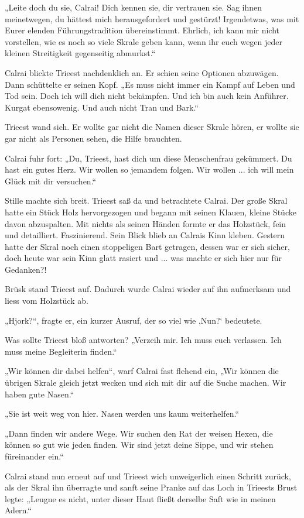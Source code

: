 „Leite doch du sie, Calrai! Dich kennen sie, dir vertrauen sie. Sag ihnen meinetwegen, du hättest mich herausgefordert und gestürzt! Irgendetwas, was mit Eurer elenden Führungstradition übereinstimmt. Ehrlich, ich kann mir nicht vorstellen, wie es noch so viele Skrale geben kann, wenn ihr euch wegen jeder kleinen Streitigkeit gegenseitig abmurkst.“

Calrai blickte Trieest nachdenklich an. Er schien seine Optionen abzuwägen. Dann schüttelte er seinen Kopf. „Es muss nicht immer ein Kampf auf Leben und Tod sein. Doch ich will dich nicht bekämpfen. Und ich bin auch kein Anführer. Kurgat ebensowenig. Und auch nicht Tran und Bark.“

Trieest wand sich. Er wollte gar nicht die Namen dieser Skrale hören, er wollte sie gar nicht als Personen sehen, die Hilfe brauchten.

Calrai fuhr fort: „Du, Trieest, hast dich um diese Menschenfrau gekümmert. Du hast ein gutes Herz. Wir wollen so jemandem folgen. Wir wollen ... ich will mein Glück mit dir versuchen.“

Stille machte sich breit. Trieest saß da und betrachtete Calrai. Der große Skral hatte ein Stück Holz hervorgezogen und begann mit seinen Klauen, kleine Stücke davon abzuspalten. Mit nichts als seinen Händen formte er das Holzstück, fein und detailliert. Faszinierend. Sein Blick blieb an Calrais Kinn kleben. Gestern hatte der Skral noch einen stoppeligen Bart getragen, dessen war er sich sicher, doch heute war sein Kinn glatt rasiert und ... was machte er sich hier nur für Gedanken?!

Brüsk stand Trieest auf. Dadurch wurde Calrai wieder auf ihn aufmerksam und liess vom Holzstück ab.

„Hjork?“, fragte er, ein kurzer Ausruf, der so viel wie ‚Nun?‘ bedeutete.

Was sollte Trieest bloß antworten? „Verzeih mir. Ich muss euch verlassen. Ich muss meine Begleiterin finden.“

„Wir können dir dabei helfen“, warf Calrai fast flehend ein, „Wir können die übrigen Skrale gleich jetzt wecken und sich mit dir auf die Suche machen. Wir haben gute Nasen.“

„Sie ist weit weg von hier. Nasen werden uns kaum weiterhelfen.“

„Dann finden wir andere Wege. Wir suchen den Rat der weisen Hexen, die können so gut wie jeden finden. Wir sind jetzt deine Sippe, und wir stehen füreinander ein.“

Calrai stand nun erneut auf und Trieest wich unweigerlich einen Schritt zurück, als der Skral ihn überragte und sanft seine Pranke auf das Loch in Trieests Brust legte: „Leugne es nicht, unter dieser Haut fließt derselbe Saft wie in meinen Adern.“

